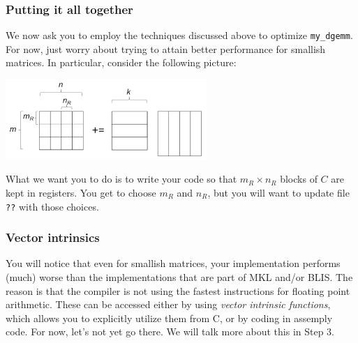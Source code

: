 \subsubsection{Putting it all together}

We now ask you to employ the techniques discussed above to optimize {\tt my\_dgemm}.  For now, just worry about trying to attain better performance for smallish matrices.  In particular, consider the following picture:
\begin{center}
	\includegraphics[width=3in]{figures/Step2.pdf}
\end{center}
What we want you to do is to write your code so that $ m_R \times n_R $ blocks of $ C $ are kept in registers.  
You get to choose $ m_R $ and $ n_R $, but you will want to update file {\tt ??} with those choices.

\subsubsection{Vector intrinsics}

You will notice that even for smallish matrices, your implementation performs (much) worse than the implementations that are part of MKL and/or BLIS.  
The reason is that the compiler is not using the fastest instructions for floating point arithmetic.  These can be accessed either by using {\em vector intrinsic functions}, which allows you to explicitly utilize them from C, or by coding in assemply code.  For now, let's not yet go there.  We will talk more about this in Step 3.
